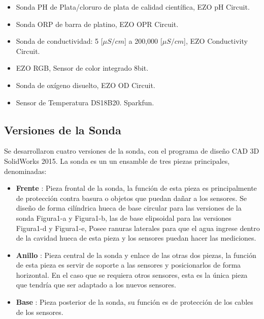 \begin{itemize}
    \item Sonda PH de Plata/cloruro de plata de calidad científica, EZO pH Circuit.
    \item Sonda ORP de barra de platino, EZO OPR Circuit.
    \item Sonda de conductividad: 5 [\(\mu S/cm\)] a 200,000 [\(\mu S/cm\)], EZO Conductivity Circuit.
    \item EZO RGB, Sensor de color integrado 8bit.
    \item Sonda de oxígeno disuelto, EZO OD Circuit.
    \item Sensor de Temperatura DS18B20. Sparkfun.
\end{itemize}
    
\subsection{Versiones de la Sonda }
Se desarrollaron cuatro versiones de la sonda, con el programa de diseño CAD 3D SolidWorks 2015. La sonda es un un ensamble de tres piezas principales, denominadas:

\begin{itemize}
\item \textbf{Frente} : Pieza frontal de la sonda, la función de esta pieza es principalmente de protección contra basura o objetos que puedan dañar a los sensores. Se diseño de forma cilíndrica hueca de base circular para las versiones de la sonda Figura1-a y Figura1-b, las de base elipsoidal para las versiones Figura1-d y Figura1-e, Posee ranuras laterales para que el agua ingrese dentro de la cavidad hueca de esta pieza y los sensores puedan hacer las mediciones.  
\item \textbf{Anillo} : Pieza central de la sonda y enlace de las otras dos piezas, la función de esta pieza es servir de soporte a las sensores y posicionarlos de forma horizontal. En el caso que se requiera otros sensores, esta es la única pieza que tendría que ser adaptado a los nuevos sensores.
\item \textbf{Base}  : Pieza posterior de la sonda, su función es de protección de los cables de los sensores. 
\end{itemize}

